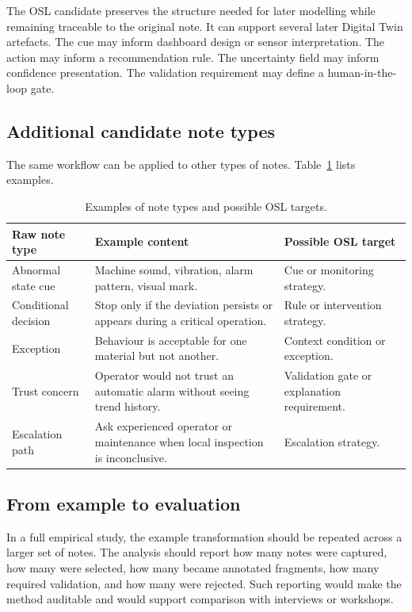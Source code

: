 The OSL candidate preserves the structure needed for later modelling while remaining traceable to the original note. It can support several later Digital Twin artefacts. The cue may inform dashboard design or sensor interpretation. The action may inform a recommendation rule. The uncertainty field may inform confidence presentation. The validation requirement may define a human-in-the-loop gate.

\subsection{Additional candidate note types}

The same workflow can be applied to other types of notes. Table~\ref{tab:note-types} lists examples.

\begin{table}[htbp]
\centering
\caption{Examples of note types and possible OSL targets.}
\label{tab:note-types}
\begin{tabularx}{\textwidth}{p{}p{}X}
\toprule
Raw note type & Example content & Possible OSL target \\
\midrule
Abnormal state cue & Machine sound, vibration, alarm pattern, visual mark. & Cue or monitoring strategy. \\
Conditional decision & Stop only if the deviation persists or appears during a critical operation. & Rule or intervention strategy. \\
Exception & Behaviour is acceptable for one material but not another. & Context condition or exception. \\
Trust concern & Operator would not trust an automatic alarm without seeing trend history. & Validation gate or explanation requirement. \\
Escalation path & Ask experienced operator or maintenance when local inspection is inconclusive. & Escalation strategy. \\
\bottomrule
\end{tabularx}
\end{table}

\subsection{From example to evaluation}

In a full empirical study, the example transformation should be repeated across a larger set of notes. The analysis should report how many notes were captured, how many were selected, how many became annotated fragments, how many required validation, and how many were rejected. Such reporting would make the method auditable and would support comparison with interviews or workshops.
